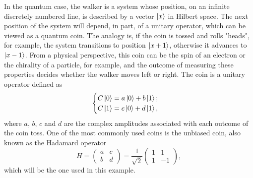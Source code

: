 \documentclass[../../dissertation.tex]{subfiles}
\begin{document}
In the quantum case, the walker is a system whose position, on an infinite
discretely numbered line, is described by a vector $\ket{x}$ in Hilbert space.
The next position of the system will depend, in part, of a unitary operator,
which can be viewed as a quantum coin.
The analogy is, if the coin is tossed and rolls "heads", for example, the
system transitions to position $\ket{x+1}$, otherwise it advances to
$\ket{x-1}$. From a physical perspective, this coin can be the spin of an
electron or the chirality of a particle, for example, and the outcome of
measuring these properties decides whether the walker moves left or right. The
coin is a unitary operator defined as
\begin{equation}
	\begin{cases}
		C\ket{0} = a\ket{0} + b\ket{1};\\
		C\ket{1} = c\ket{0} + d\ket{1},
	\end{cases}
\end{equation}
where $a$, $b$, $c$ and $d$ are the complex amplitudes associated with each outcome of
the coin toss. One of the most commonly used coins is the unbiased coin, also
known as the Hadamard operator
\begin{equation}
	H = \begin{pmatrix} 
		a & c\\
		b & d
	    \end{pmatrix}
	    =\frac{1}{\sqrt{2}} \begin{pmatrix}
			    		1 & 1\\
					1 & -1
	   		       \end{pmatrix},
\end{equation}
which will be the one used in this example.\par 
\end{document}
